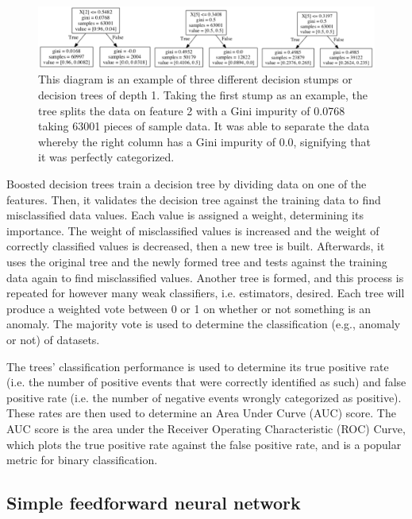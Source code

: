 \documentclass[5p]{elsarticle}
\begin{document}
\begin{figure}[htbp]
    \centering
    \includegraphics[width=\linewidth]{stumps.png}
    \caption{This diagram is an example of three different decision stumps or decision trees of depth 1. Taking the first stump as an example, the tree splits the data on feature 2 with a Gini impurity of 0.0768 taking 63001 pieces of sample data. It was able to separate the data whereby the right column has a Gini impurity of 0.0, signifying that it was perfectly categorized.}
    \label{fig:stumps}
\end{figure}

Boosted decision trees train a decision tree by dividing data on one of the features. Then, it validates the decision tree against the training data to find misclassified data values. Each value is assigned a weight, determining its importance. The weight of misclassified values is increased and the weight of correctly classified values is decreased, then a new tree is built. Afterwards, it uses the original tree and the newly formed tree and tests against the training data again to find misclassified values. Another tree is formed, and this process is repeated for however many weak classifiers, i.e. estimators, desired. Each tree will produce a weighted vote between 0 or 1 on whether or not something is an anomaly. The majority vote is used to determine the classification (e.g., anomaly or not) of datasets.

The trees' classification performance is used to determine its true positive rate (i.e. the number of positive events that were correctly identified as such) and false positive rate (i.e. the number of negative events wrongly categorized as positive). These rates are then used to determine an Area Under Curve (AUC) score. The AUC score is the area under the Receiver Operating Characteristic (ROC) Curve, which plots the true positive rate against the false positive rate, and is a popular metric for binary classification.

\subsection{Simple feedforward neural network}
\end{document}
